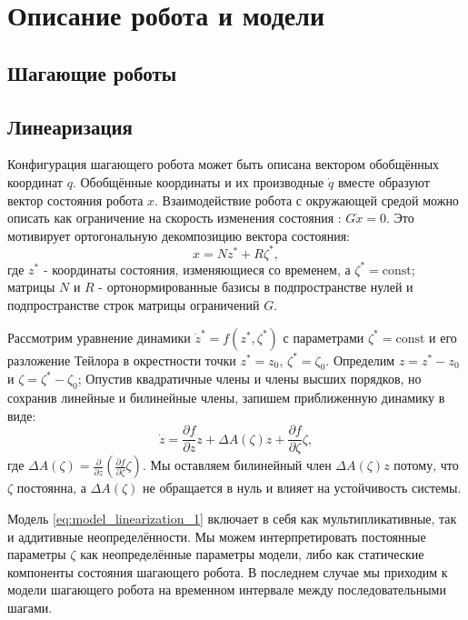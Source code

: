 \chapter{Описание робота и модели}\label{ch:ch2}
\section{Шагающие роботы}\label{sec:ch2/sec1}


\section{Линеаризация}\label{sec:ch2/sect2}
Конфигурация шагающего робота может быть описана вектором обобщённых координат $q$. Обобщённые координаты и их производные $\dot q$ вместе образуют вектор состояния робота $x$. Взаимодействие робота с окружающей средой можно описать как ограничение на скорость изменения состояния \cite{mason2014full}: ${G} \dot x = 0$. Это мотивирует ортогональную декомпозицию вектора состояния:
%
\begin{equation}
	x = {N} z^* + {R} \zeta^* ,
\end{equation}
%
где $z^*$ - координаты состояния, изменяющиеся со временем, а $\zeta^* = \text{const}$; матрицы ${N}$ и ${R}$ - ортонормированные базисы в подпространстве нулей и подпространстве строк матрицы ограничений ${G}$.

Рассмотрим уравнение динамики $\dot z^* = f(z^*, \zeta^*)$ с параметрами $\zeta^* = \text{const}$ и его разложение Тейлора в окрестности точки $z^* = z_0$, $\zeta^* = \zeta_0$. Определим $z = z^* - z_0$ и $\zeta = \zeta^* - \zeta_0$;
Опустив квадратичные члены и члены высших порядков, но сохранив линейные и билинейные члены, запишем приближенную динамику в виде:
%
\begin{equation}
	\label{eq:model_linearization_1}
	\dot z = \frac{\partial f}{\partial z} z + \Delta {A}(\zeta) z + \frac{\partial f}{\partial \zeta} \zeta ,
\end{equation}
%
где $\Delta {A}(\zeta) = \frac{\partial}{\partial z} (\frac{\partial f}{\partial \zeta} \zeta)$. Мы оставляем билинейный член $\Delta {A}(\zeta) z$ потому, что $\zeta$ постоянна, а $\Delta {A}(\zeta)$ не обращается в нуль и влияет на устойчивость системы.

Модель \eqref{eq:model_linearization_1} включает в себя как мультипликативные, так и аддитивные неопределённости. Мы можем интерпретировать постоянные параметры $\zeta$ как неопределённые параметры модели, либо как статические компоненты состояния шагающего робота. В последнем случае мы приходим к модели шагающего робота на временном интервале между последовательными шагами.

